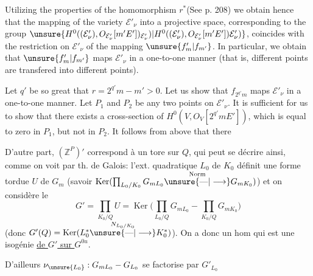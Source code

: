 Utilizing the properties of the homomorphism $r^*$(See p. 208) we obtain hence that the mapping of the variety $\mathcal E'_\nu$ into a projective space, corresponding to the group $\unsure{H^0((\mathcal E'_\nu),O_{\mathcal E'_\nu}[m'E'])_{\mathcal E'_\nu})|H^0((\mathcal E'_\nu),O_{\mathcal E'_\nu}[m'E'])\mathcal E'_\nu)}$, coincides with the restriction on $\mathcal E'_\nu$ of the mapping $\unsure{f_m'|f_{m'}}$. In particular, we obtain that $\unsure{f_m'|f_{m'}}$ maps $\mathcal E'_\nu$ in a one-to-one manner (that is, different points are transfered into different points).

Let $q'$ be so great that $r=2^{q'}m-m'>0$. Let us show that $f_{2^{q'}m}$ maps $\mathcal E'_\nu$ in a one-to-one manner. Let $P_1$ and $P_2$ be any two points on $\mathcal E'_\nu$. It is sufficient for us to show that there exists a cross-section of $H^0(V,O_V[2^{q'}mE'])$, which is equal to zero in $P_1$, but not in $P_2$. It follows from above that there

D'autre part, $(\mathbb Z^P)'$ correspond à un tore sur $Q$, qui peut se décrire ainsi, comme on voit par th. de Galois: l'ext. quadratique $L_0$ de $K_0$ définit une forme tordue $U$ de $G_m$ (savoir $\operatorname{Ker}(\prod_{L_0/K_0}G_{mL_0}\overset{\text{Norm}}{\unsure{\text{—}|\longrightarrow}}G_{mK_0})$) et on considère le
\[
G'=\prod_{K_0/Q}U=\operatorname{Ker}\bigl(\prod_{L_0/Q}G_{mL_0}\mathbin{-}\prod_{K_0/Q}G_{mK_0}\bigr)
\]
(donc $G'(Q)=\operatorname{Ker}(L_0^*\overset{N_{L_0/K_0}}{\unsure{\text{—}|\longrightarrow}}K_0^*)$). On a donc un hom
qui est une isogénie \uline{de $G'$ sur $G^{0u}$}.

D'ailleurs $\nu_{\unsure{L_0}}:G_{mL_0}\mathbin{-}G_{L_0}$ se factorise par $G'_{L_0}$

